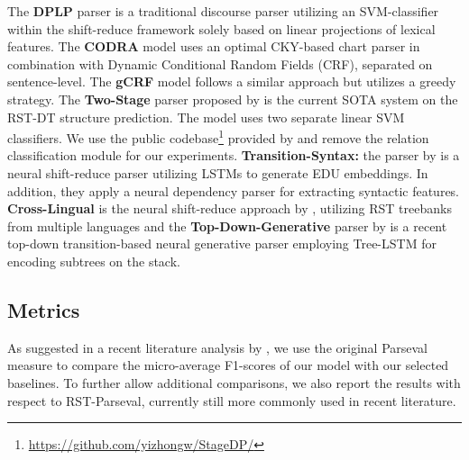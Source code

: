 \documentclass[11pt]{article}
\begin{document}
The \textbf{DPLP} parser \cite{ji2014representation} is a traditional discourse parser utilizing an SVM-classifier within the shift-reduce framework solely based on linear projections of lexical features. The \textbf{CODRA} model \cite{joty2015codra} uses an optimal CKY-based chart parser in combination with Dynamic Conditional Random Fields (CRF), separated on sentence-level. The \textbf{gCRF} model \cite{feng-hirst-2014-linear} follows a similar approach but utilizes a greedy strategy. The \textbf{Two-Stage} parser proposed by  is the current SOTA system on the RST-DT structure prediction. The model uses two separate linear SVM classifiers. We use the public codebase\footnote{\url{https://github.com/yizhongw/StageDP/}} provided by  and remove the relation classification module for our experiments. \textbf{Transition-Syntax:} the parser by  is a neural shift-reduce parser utilizing LSTMs to generate EDU embeddings. In addition, they apply a neural dependency parser for extracting syntactic features. \textbf{Cross-Lingual} is the neural shift-reduce approach by , utilizing RST treebanks from multiple languages and the \textbf{Top-Down-Generative} parser by  is a recent top-down transition-based neural generative parser employing Tree-LSTM for encoding subtrees on the stack. 




\subsection{Metrics} 
\label{metrics}
As suggested in a recent literature analysis by , we use the original Parseval measure to compare the micro-average F1-scores of our model with our selected baselines. To further allow additional comparisons, we also report the results with respect to RST-Parseval, currently still more commonly used in recent literature. 
\end{document}
